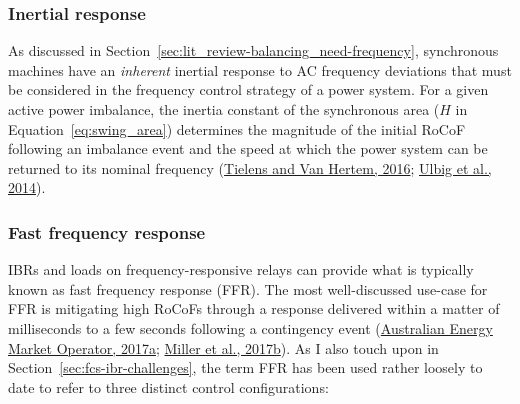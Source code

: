 \documentclass[12pt,a4paper,]{report}
\begin{document}
\hypertarget{sec:lit_review-balancing_practices-inertial_response}{%
\subsubsection{Inertial
response}\label{sec:lit_review-balancing_practices-inertial_response}}

As discussed in Section~\ref{sec:lit_review-balancing_need-frequency},
synchronous machines have an \emph{inherent} inertial response to AC
frequency deviations that must be considered in the frequency control
strategy of a power system. For a given active power imbalance, the
inertia constant of the synchronous area (\(H\) in
Equation~\ref{eq:swing_area}) determines the magnitude of the initial
RoCoF following an imbalance event and the speed at which the power
system can be returned to its nominal frequency
(\protect\hyperlink{ref-tielensRelevanceInertiaPower2016}{Tielens and
Van Hertem, 2016};
\protect\hyperlink{ref-ulbigImpactLowRotational2014}{Ulbig et al.,
2014}).

\hypertarget{fast-frequency-response}{%
\subsubsection{Fast frequency response}\label{fast-frequency-response}}

IBRs and loads on frequency-responsive relays can provide what is
typically known as fast frequency response (FFR). The most
well-discussed use-case for FFR is mitigating high RoCoFs through a
response delivered within a matter of milliseconds to a few seconds
following a contingency event
(\protect\hyperlink{ref-australianenergymarketoperatorFastFrequencyResponse2017}{Australian
Energy Market Operator, 2017a};
\protect\hyperlink{ref-millerTechnologyCapabilitiesFast2017}{Miller et
al., 2017b}). As I also touch upon in
Section~\ref{sec:fcs-ibr-challenges}, the term FFR has been used rather
loosely to date to refer to three distinct control configurations:
\end{document}
